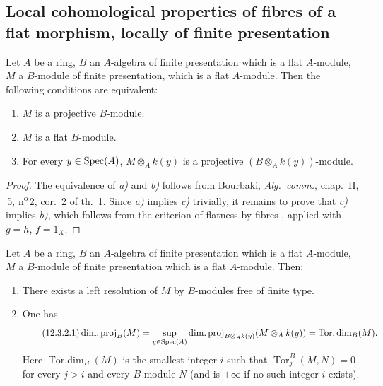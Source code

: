 \subsection{Local cohomological properties of fibres of a flat morphism, locally of finite presentation}
\label{subsection:IV.12.3}

\begin{lemma}[12.3.1]
\label{IV.12.3.1}
Let $A$ be a ring, $B$ an $A$-algebra of finite presentation which is a flat $A$-module, $M$ a $B$-module of finite presentation, which is a flat $A$-module.
Then the following conditions are equivalent:
\begin{enumerate}[label=\emph{\alph*)}]
  \item $M$ is a projective $B$-module.
  \item $M$ is a flat $B$-module.
  \item For every $y\in\operatorname{Spec}(A)$, $M\otimes_A k(y)$ is a projective $(B\otimes_A k(y))$-module.
\end{enumerate}
\end{lemma}

\begin{proof}

The equivalence of \emph{a)} and \emph{b)} follows from Bourbaki, \emph{Alg.\ comm.}, chap.~II, \textsection\,5, n\textsuperscript{o}\,2, cor.~2 of th.~1.
Since \emph{a)} implies \emph{c)} trivially, it remains to prove that \emph{c)} implies \emph{b)}, which follows from the criterion of flatness by fibres , applied with $g=h$, $f=1_X$.
\end{proof}

\begin{proposition}[12.3.2]
\label{IV.12.3.2}
Let $A$ be a ring, $B$ an $A$-algebra of finite presentation which is a flat $A$-module, $M$ a $B$-module of finite presentation which is a flat $A$-module.
Then:
\begin{enumerate}[label=(\roman*)]
  \item There exists a left resolution of $M$ by $B$-modules free of finite type.
  \item One has
  \begin{equation}
  \tag{12.3.2.1}
  \label{IV.12.3.2.1}
    \operatorname{dim.proj}_B(M)
    = \sup_{y\in\operatorname{Spec}(A)} \operatorname{dim.proj}_{B\otimes_A k(y)}(M\otimes_A k(y))
    = \operatorname{Tor.dim}_B(M).
  \end{equation}
  Here $\operatorname{Tor.dim}_B(M)$ is the smallest integer $i$ such that $\operatorname{Tor}_j^B(M,N)=0$ for every $j>i$ and every $B$-module $N$ (and is $+\infty$ if no such integer $i$ exists).
\end{enumerate}
\end{proposition}

